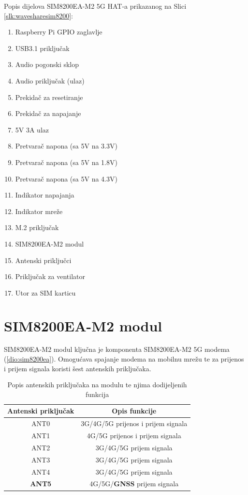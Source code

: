 \documentclass[zavrsnirad]{fer}
\begin{document}
Popis dijelova SIM8200EA-M2 5G HAT-a prikazanog na Slici \ref{slk:wavesharesim8200}:

\begin{enumerate}
  \itemsep-0.5em
  \item Raspberry Pi GPIO zaglavlje
  \item USB3.1 priključak
  \item Audio pogonski sklop
  \item Audio priključak (ulaz)
  \item Prekidač za resetiranje
  \item Prekidač za napajanje
  \item 5V 3A ulaz
  \item Pretvarač napona (sa 5V na 3.3V)
  \item Pretvarač napona (sa 5V na 1.8V)
  \item Pretvarač napona (sa 5V na 4.3V)
  \item Indikator napajanja
  \item Indikator mreže
  \item M.2 priključak
  \item SIM8200EA-M2 modul
  \item Antenski priključci
  \item Priključak za ventilator
  \item Utor za SIM karticu
\end{enumerate}

\section{SIM8200EA-M2 modul}
\label{dio:sim8200eamodul}

SIM8200EA-M2 modul ključna je komponenta SIM8200EA-M2 5G modema (\ref{dio:sim8200ea}).
Omogućava spajanje modema na mobilnu mrežu te za prijenos i prijem signala koristi šest antenskih priključaka.

\vspace{1em}

\begin{table}[h!]
  \centering
  \begin{tabular}{|c|c|}
      \hline
      \textbf{Antenski priključak} & \textbf{Opis funkcije} \\
      \hline
      ANT0 & 3G/4G/5G prijenos i prijem signala \\
      \hline
      ANT1 & 4G/5G prijenos i prijem signala \\
      \hline
      ANT2 & 3G/4G/5G prijem signala \\
      \hline
      ANT3 & 3G/4G/5G prijem signala \\
      \hline
      ANT4 & 3G/4G/5G prijem signala \\
      \hline
      \textbf{ANT5} & 4G/5G/\textbf{GNSS} prijem signala \\
      \hline
  \end{tabular}
  \caption{Popis antenskih priključaka na modulu te njima dodijeljenih funkcija \cite{WaveshareModule}}
  \label{tab:antenna_table}
\end{table}
\end{document}
